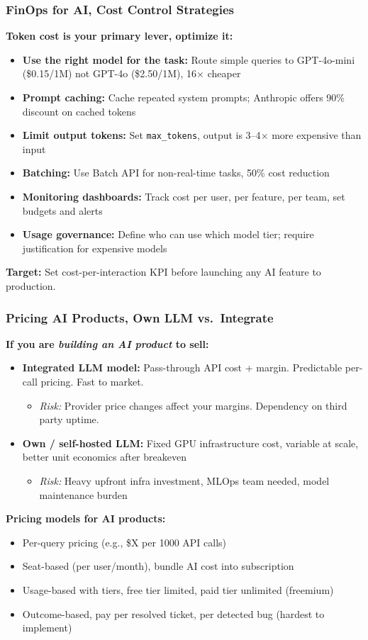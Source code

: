 \begin{frame}[fragile]\frametitle{FinOps for AI, Cost Control Strategies}
\textbf{Token cost is your primary lever, optimize it:}
\begin{itemize}
\item \textbf{Use the right model for the task:} Route simple queries to GPT-4o-mini (\$0.15/1M) not GPT-4o (\$2.50/1M), 16$\times$ cheaper
\item \textbf{Prompt caching:} Cache repeated system prompts; Anthropic offers 90\% discount on cached tokens
\item \textbf{Limit output tokens:} Set \texttt{max\_tokens}, output is 3--4$\times$ more expensive than input
\item \textbf{Batching:} Use Batch API for non-real-time tasks, 50\% cost reduction
\item \textbf{Monitoring dashboards:} Track cost per user, per feature, per team, set budgets and alerts
\item \textbf{Usage governance:} Define who can use which model tier; require justification for expensive models
\end{itemize}

\textbf{Target:} Set cost-per-interaction KPI before launching any AI feature to production.
\end{frame}

\begin{frame}[fragile]\frametitle{Pricing AI Products, Own LLM vs.\ Integrate}
\textbf{If you are \textit{building an AI product} to sell:}
\begin{itemize}
\item \textbf{Integrated LLM model:} Pass-through API cost + margin. Predictable per-call pricing. Fast to market.
  \begin{itemize}
  \item \textit{Risk:} Provider price changes affect your margins. Dependency on third party uptime.
  \end{itemize}
\item \textbf{Own / self-hosted LLM:} Fixed GPU infrastructure cost, variable at scale, better unit economics after breakeven
  \begin{itemize}
  \item \textit{Risk:} Heavy upfront infra investment, MLOps team needed, model maintenance burden
  \end{itemize}
\end{itemize}

\textbf{Pricing models for AI products:}
\begin{itemize}
\item Per-query pricing (e.g., \$X per 1000 API calls)
\item Seat-based (per user/month), bundle AI cost into subscription
\item Usage-based with tiers, free tier limited, paid tier unlimited (freemium)
\item Outcome-based, pay per resolved ticket, per detected bug (hardest to implement)
\end{itemize}
\end{frame}


